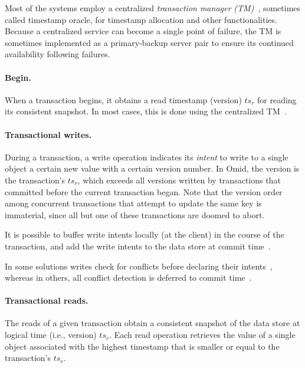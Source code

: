 Most of the systems employ a centralized \emph{transaction manager (TM)}~\cite{Percolator2010,OmidICDE2014,Omid2017,tephra},
 sometimes called timestamp oracle, for timestamp allocation and other functionalities. 
 Because a centralized service can become a single point of failure, the TM is sometimes implemented
 as a primary-backup server pair to ensure its continued availability following failures.

\paragraph{Begin.} 
  When a transaction begins, it obtains a read timestamp (version) $ts_r$ for reading its consistent snapshot.
 In most cases, this is done using the centralized TM~\cite{Percolator2010,OmidICDE2014,Omid2017,tephra}. 

\paragraph{Transactional writes.} 
 During a transaction, a write operation indicates its \emph{intent} to write to a single object a certain new value with a certain version number.
In Omid, the version is the transaction's $ts_r$, which exceeds all versions written by transactions that committed before the
current transaction began. Note that the version order among concurrent transactions that  attempt to update the same key is immaterial, 
since all but one of these transactions are doomed to abort. 

It is possible to buffer write intents locally (at the client) in the course of the transaction, and add the write intents to the data store at commit time~\cite{Percolator2010}.

In some solutions writes check for conflicts before declaring their intents~\cite{cockroach}, whereas in others, 
all conflict detection is deferred to commit time~\cite{Percolator2010,OmidICDE2014,Omid2017,tephra}. 

\paragraph{Transactional reads.} 
The reads of a given transaction obtain a consistent snapshot of the data store at logical time (i.e., version) $ts_r$.
Each read operation retrieves the value of a single object associated with the highest timestamp that is 
smaller or equal to the transaction's $ts_r$. 

